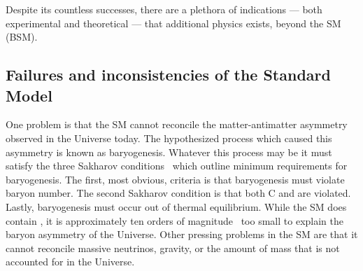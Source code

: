 Despite its countless successes, there are a plethora of indications --- both
experimental and theoretical --- that additional physics exists, beyond the SM (BSM).



\subsection{Failures and inconsistencies of the Standard Model}
\label{sec:bsm:fail}
One problem is that the SM cannot reconcile the matter-antimatter asymmetry observed in the
Universe today.
The hypothesized process which caused this asymmetry is known as baryogenesis.
Whatever this process may be it must satisfy the three Sakharov
conditions~\cite{1991SvPhU..34..392S} which outline minimum requirements for baryogenesis.
The first, most obvious, criteria is that baryogenesis must violate baryon number.
The second Sakharov condition is that both C and \CP are violated.
Lastly, baryogenesis must occur out of thermal equilibrium.
While the SM does contain \CPV, it is approximately ten orders of
magnitude~\cite{Cline:2006ts,Huet:1994jb} too small to explain the baryon asymmetry of the
Universe.
Other pressing problems in the SM are that it cannot reconcile massive neutrinos, gravity, or the
amount of mass that is not accounted for in the Universe.


